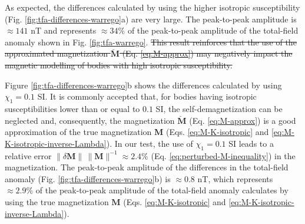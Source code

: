 \documentclass[gmd, manuscript]{copernicus}
\providecommand{\DIFadd}[1]{{\protect\color{blue}\uwave{#1}}} %
\providecommand{\DIFdel}[1]{{\protect\color{red}\sout{#1}}}                      %
\providecommand{\DIFaddbegin}{} %
\providecommand{\DIFaddend}{} %
\providecommand{\DIFdelbegin}{} %
\providecommand{\DIFdelend}{} %
\begin{document}
As expected, the differences calculated by using the higher isotropic
susceptibility (Fig. \ref{fig:tfa-differences-warrego}a) are very large.
The peak-to-peak amplitude is \DIFdelbegin \DIFdel{$\approx 141$ }\DIFdelend \DIFaddbegin \DIFadd{$\approx 40$ }\DIFaddend \unit{nT}
and represents \DIFdelbegin \DIFdel{$\approx 34 \%$ }\DIFdelend \DIFaddbegin \DIFadd{$\approx 8 \%$ }\DIFaddend of the peak-to-peak amplitude of
the total-field anomaly shown in Fig. \ref{fig:tfa-warrego}.
\DIFdelbegin \DIFdel{This result reinforces that the use of the approximated magnetization
$\breve{\mathbf{M}}$ (Eq. \ref{eq:M-approx}) may negatively impact
the magnetic modelling of bodies with high isotropic susceptibility.
}\DIFdelend %

Figure \ref{fig:tfa-differences-warrego}b shows the differences calculated
by using $\chi_{1} = 0.1$ \unit{SI}.
It is commonly accepted that, for bodies having isotropic susceptibilities
lower than or equal to $0.1$ \unit{SI}, the self-demagnetization can be neglected and,
consequently, the magnetization $\breve{\mathbf{M}}$ (Eq. \ref{eq:M-approx})
is a good approximation of the true magnetization $\mathbf{M}$
(Eqs. \ref{eq:M-K-isotropic} and \ref{eq:M-K-isotropic-inverse-Lambda}).
In our test, the use of $\chi_{1} = 0.1$ \unit{SI} leads to a relative error
\DIFdelbegin \DIFdel{$\| \delta \mathbf{M} \| \, \| \mathbf{M} \|^{-1} \approx 2.4 \%$
}\DIFdelend \DIFaddbegin \DIFadd{$\| \delta \mathbf{M} \| \, \| \mathbf{M} \|^{-1} \approx 0.7 \%$
}\DIFaddend (Eq. \ref{eq:perturbed-M-inequality}) in the magnetization.
The peak-to-peak amplitude of the differences in the total-field anomaly
(Fig. \ref{fig:tfa-differences-warrego}b) is \DIFdelbegin \DIFdel{$\approx 0.8$ }\DIFdelend \DIFaddbegin \DIFadd{$\approx 0.2$ }\DIFaddend \unit{nT},
which represents \DIFdelbegin \DIFdel{$\approx 2.9 \%$ }\DIFdelend \DIFaddbegin \DIFadd{$\approx 0.6 \%$ }\DIFaddend of the peak-to-peak amplitude of the
total-field anomaly calculates by using the true magnetization $\mathbf{M}$
(Eqs. \ref{eq:M-K-isotropic} and \ref{eq:M-K-isotropic-inverse-Lambda}).
\end{document}
